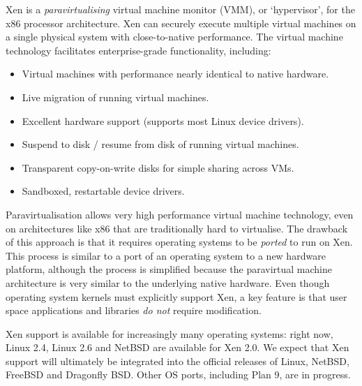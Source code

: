 \documentclass[11pt,twoside,final,openright]{xenstyle}
\begin{document}
Xen is a { \em paravirtualising } virtual machine monitor (VMM), or
`hypervisor', for the x86 processor architecture.  Xen can securely
execute multiple virtual machines on a single physical system with
close-to-native performance.  The virtual machine technology
facilitates enterprise-grade functionality, including:

\begin{itemize}
\item Virtual machines with performance nearly identical to native
  hardware.
\item Live migration of running virtual machines.
\item Excellent hardware support (supports most Linux device drivers).
\item Suspend to disk / resume from disk of running virtual machines.
\item Transparent copy-on-write disks for simple sharing across VMs.
\item Sandboxed, restartable device drivers.
\end{itemize}

Paravirtualisation allows very high performance virtual machine
technology, even on architectures like x86 that are traditionally
hard to virtualise.
The drawback of this approach is that it requires operating systems to
be {\em ported} to run on Xen.  This process is similar to a port of
an operating system to a new hardware platform, although the process
is simplified because the paravirtual machine architecture is very
similar to the underlying native hardware. Even though operating system
kernels must explicitly support Xen, a key feature is that user space
applications and libraries {\em do not} require modification.

Xen support is available for increasingly many operating systems:
right now, Linux 2.4, Linux 2.6 and NetBSD are available for Xen 2.0.
We expect that Xen support will ultimately be integrated into the
official releases of Linux, NetBSD, FreeBSD and Dragonfly BSD. 
Other OS ports, including Plan 9, are in progress.
\end{document}
